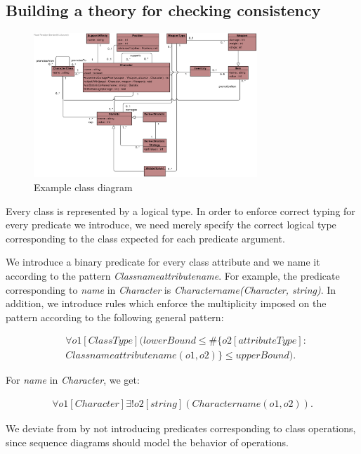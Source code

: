 \documentclass[conference]{IEEEtran}
\begin{document}
\subsection{Building a theory for checking consistency}\label{sec:consistency}

\begin{figure}[!t]
\centering
\includegraphics[width=0.75\textwidth]{diagram-voorbeeld}
\caption{Example class diagram}
\label{fig:game-class}
\end{figure}

Every class is represented by a logical type. In order to enforce correct typing for every predicate we introduce, we need merely specify the correct logical type corresponding to the class expected for each predicate argument.

We introduce a binary predicate for every class attribute and we name it according to the pattern \textit{Classnameattributename}. For example, the predicate corresponding to \textit{name} in \textit{Character} is \textit{Charactername(Character, string)}. In addition, we introduce rules which enforce the multiplicity imposed on the pattern according to the following general pattern:

\begin{align*}
	&\forall{o1}[ClassType](lowerBound \leq \#\{o2[attributeType] : \\ &Classnameattributename(o1, o2)\} \leq upperBound).
\end{align*}

For \textit{name} in \textit{Character}, we get:

\begin{align*}
	\forall{o1}[Character]\exists!{o2}[string](Charactername(o1, o2)).
\end{align*}

We deviate from \cite{BerardiDaniela2005RoUc} by not introducing predicates corresponding to class operations, since sequence diagrams should model the behavior of operations.
\end{document}

